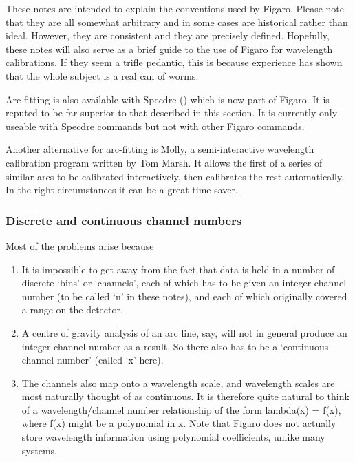    These notes are intended to explain the conventions used by Figaro.
   Please note that they are all somewhat arbitrary and in some cases
   are historical rather than ideal. However, they are consistent and
   they are precisely defined. Hopefully, these notes will also serve as
   a brief guide to the use of Figaro for wavelength calibrations.  If
   they seem a trifle pedantic, this is because experience has shown
   that the whole subject is a real can of worms.

   Arc-fitting is also available with Specdre
   {()}
   which is now part of Figaro. 
   It is reputed to be far superior to that described in this section. 
   It is currently only useable with Specdre commands but not with other 
   Figaro commands.

   Another alternative for arc-fitting is
   Molly, a semi-interactive wavelength calibration program written
   by Tom Marsh. It allows the first of a series of similar arcs to be
   calibrated interactively, then calibrates the rest automatically. In
   the right circumstances it can be a great time-saver.


\subsubsection{\label{techno8channels}Discrete and continuous channel numbers}

   Most of the problems arise because

\begin{enumerate}
\item
   It is impossible to get away from the fact that data is held in a
   number of discrete `bins' or `channels', each of which has to be
   given an integer channel number (to be called `n' in these notes),
   and each of which originally covered a range on the detector.
\item
   A centre of gravity analysis of an arc line, say, will not in
   general produce an integer channel number as a result.  So there also
   has to be a `continuous channel number' (called `x' here).
\item
   The channels also map onto a wavelength scale, and wavelength
   scales are most naturally thought of as continuous.  It is therefore
   quite natural to think of a wavelength/channel number relationship of
   the form lambda(x) = f(x), where f(x) might be a polynomial in x.
   Note that Figaro does not actually store wavelength information using
   polynomial coefficients, unlike many systems.
\end{enumerate}

